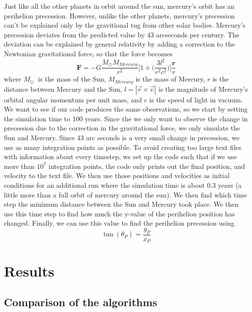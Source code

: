 \documentclass{article}
\begin{document}
\begin{multicols}{2}
Just like all the other planets in orbit around the sun, mercury's orbit has an perihelion precession. However, unlike the other planets, mercury's precession can't be explained only by the gravitional tug from other solar bodies. Mercury's precession deviates from the predicted value by 43 arcseconds per century. The deviation can be explained by general relativity by adding a correction to the Newtonian gravitational force, so that the force becomes
\begin{equation}
\mathbf{F}=-G\frac{M_{\odot}M_{Mercury}}{r^2}\Bigg[1+\Bigg(\frac{3l^2}{r^2c^2}\bigg)\bigg]\frac{\mathbf{r}}{r} \label{eq:relcor}
\end{equation}
where $M_\odot\ $ is the mass of the Sun, $M_{Mercury}$ is the mass of Mercury, $r$ is the distance between Mercury and the Sun, $l = |\vec{r} \times \vec{v}|$ is the magnitude of Mercury’s orbital angular momentum per unit mass, and $c$ is the speed of light in vacuum. We want to see if our code produces the same observations, so we start by setting the simulation time to 100 years. Since the we only want to observe the change in precession due to the correction in the gravitational force, we only simulate the Sun and Mercury. Since 43 arc seconds is a very small change in precession, we use as many integration points as possible. To avoid creating too large text files with information about every timestep, we set up the code such that if we use more than $10^7$ integration points, the code only prints out the final position, and velocity to the text file. We then use those positions and velocities as initial conditions for an additional run where the simulation time is about 0.3 years (a little more than a full orbit of mercury around the sun). We then find which time step the minimum distance between the Sun and Mercury took place. We then use this time step to find how much the y-value of the perihelion position has changed. Finally, we can use this value to find the perihelion precession using
\begin{equation}
\tan(\theta_P) = \frac{y_P}{x_P}
\end{equation}

\section{Results}

\subsection{Comparison of the algorithms}


\end{multicols}
\end{document}

